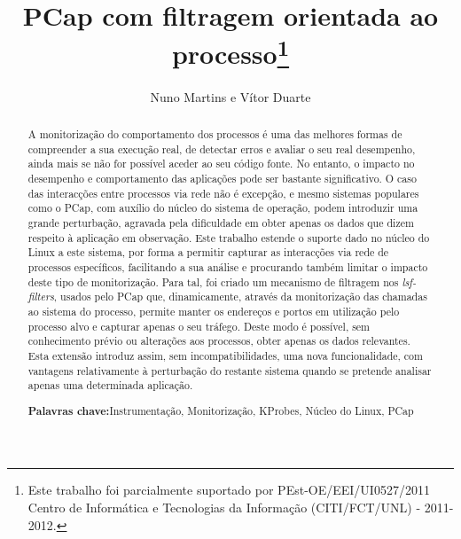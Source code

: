 \documentclass[a4paper]{llncs}
\newcommand{\papertitle}{PCap com filtragem orientada ao processo}
\newcommand{\keywords}[1]{\par\addvspace\baselineskip
\noindent\textbf{Palavras chave:}\enspace\ignorespaces#1}
\begin{document}
\mainmatter  %

\title{\papertitle \thanks{Este trabalho foi parcialmente suportado por PEst-OE/EEI/UI0527/2011
Centro de Informática e Tecnologias da Informação (CITI/FCT/UNL) - 2011-2012.}
}

\author{Nuno Martins e Vítor Duarte}
%
\authorrunning{\papertitle}


%
%

\maketitle

\begin{abstract}

A monitorização do comportamento dos processos é uma das melhores formas de compreender a sua execução real, de detectar erros e avaliar o seu real desempenho, ainda mais se não for possível aceder ao seu código fonte. 
No entanto, o impacto no desempenho e comportamento das aplicações pode ser bastante significativo.
 O caso das interacções entre processos via rede não é excepção, e mesmo sistemas populares como o PCap, com auxílio do núcleo do sistema de operação, podem introduzir uma grande perturbação, agravada pela dificuldade em obter apenas os dados que dizem respeito à aplicação em observação.
Este trabalho estende o suporte dado no núcleo do Linux a este sistema, por forma a permitir capturar as interacções via rede de processos específicos, facilitando a sua análise e procurando também limitar o impacto deste tipo de monitorização.
  Para tal, foi criado um mecanismo de filtragem nos \emph{lsf-filters}, usados pelo PCap que, dinamicamente, através da monitorização das chamadas ao sistema do processo, permite manter os endereços e portos em utilização pelo processo alvo e capturar apenas o seu tráfego. Deste modo é possível, sem conhecimento prévio ou alterações aos processos, obter apenas os dados relevantes. Esta extensão introduz assim, sem incompatibilidades, uma nova funcionalidade, com vantagens relativamente à perturbação do restante sistema quando se pretende analisar apenas uma determinada aplicação. 

\keywords{Instrumentação, Monitorização, KProbes, Núcleo do Linux, PCap}
\end{abstract}
\end{document}
